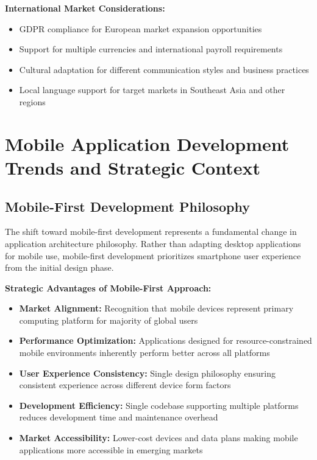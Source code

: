 \textbf{International Market Considerations:}
\begin{itemize}
    \item GDPR compliance for European market expansion opportunities
    \item Support for multiple currencies and international payroll requirements
    \item Cultural adaptation for different communication styles and business practices
    \item Local language support for target markets in Southeast Asia and other regions
\end{itemize}

\section{Mobile Application Development Trends and Strategic Context}

\subsection{Mobile-First Development Philosophy}

The shift toward mobile-first development represents a fundamental change in application architecture philosophy. Rather than adapting desktop applications for mobile use, mobile-first development prioritizes smartphone user experience from the initial design phase.

\textbf{Strategic Advantages of Mobile-First Approach:}
\begin{itemize}
    \item \textbf{Market Alignment:} Recognition that mobile devices represent primary computing platform for majority of global users
    \item \textbf{Performance Optimization:} Applications designed for resource-constrained mobile environments inherently perform better across all platforms
    \item \textbf{User Experience Consistency:} Single design philosophy ensuring consistent experience across different device form factors
    \item \textbf{Development Efficiency:} Single codebase supporting multiple platforms reduces development time and maintenance overhead
    \item \textbf{Market Accessibility:} Lower-cost devices and data plans making mobile applications more accessible in emerging markets
\end{itemize}

